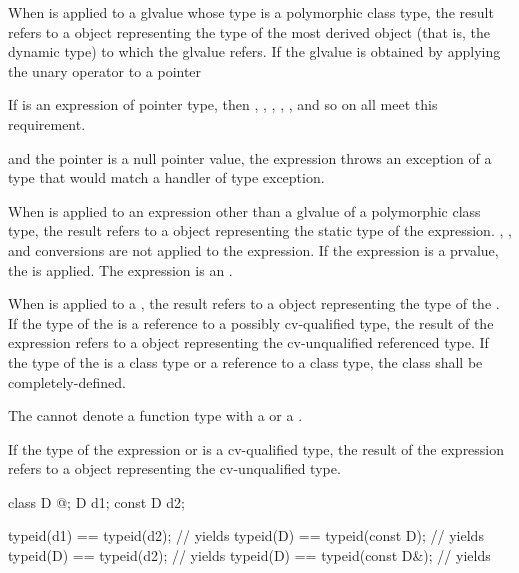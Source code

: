 \pnum
When  is applied to a glvalue whose type is a
polymorphic class type, the result refers to a
 object representing the type of the most derived
object (that is, the dynamic type) to which the
glvalue refers. If the glvalue is obtained by applying the
unary \tcode{*} operator to a pointer
\begin{footnote}
If  is an expression of
pointer type, then ,
, , , , and so on
all meet this requirement.
\end{footnote}
and the pointer is a null pointer value, the
 expression throws an exception of
a type that would match a handler of type
%
%
exception.

\pnum
When  is applied to an expression other than a glvalue of
a polymorphic class type, the result refers to a 
object representing the static type of the expression.
, ,
and  conversions are not applied to
the expression.
If the expression is a prvalue,
the 
is applied.
The expression is an .

\pnum
When  is applied to a , the result
refers to a  object representing the type of the
. If the type of the  is a reference
to a possibly cv-qualified type, the result of the
 expression refers to a  object
representing the cv-unqualified referenced type. If the type of
the  is a class type or a reference to a class type,
the class shall be completely-defined.
\begin{note}
The  cannot denote a function type with
a  or a .
\end{note}

\pnum
If the type of the expression or  is a
cv-qualified type, the result of the  expression refers
to a  object representing the cv-unqualified
type.
\begin{example}
\begin{codeblock}
class D { @\commentellip@ };
D d1;
const D d2;

typeid(d1) == typeid(d2);       // yields 
typeid(D)  == typeid(const D);  // yields 
typeid(D)  == typeid(d2);       // yields 
typeid(D)  == typeid(const D&); // yields 
\end{codeblock}
\end{example}

